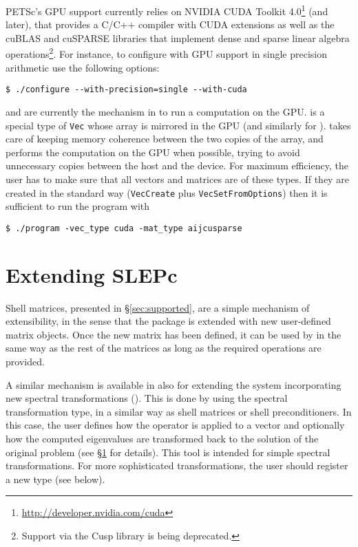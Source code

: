 PETSc's GPU support currently relies on NVIDIA CUDA Toolkit 4.0\footnote{\url{http://developer.nvidia.com/cuda}} (and later), that provides a C/C++ compiler with CUDA extensions as well as the cuBLAS and cuSPARSE libraries that implement dense and sparse linear algebra operations\footnote{Support via the Cusp library is being deprecated.}. For instance, to configure \petsc with GPU support in single precision arithmetic use the following options:
	\begin{Verbatim}[fontsize=\small]
	$ ./configure --with-precision=single --with-cuda
	\end{Verbatim}

 and  are currently the mechanism in \petsc to run a computation on the GPU.  is a special type of \texttt{Vec} whose array is mirrored in the GPU (and similarly for ). \petsc takes care of keeping memory coherence between the two copies of the array, and performs the computation on the GPU when possible, trying to avoid unnecessary copies between the host and the device. For maximum efficiency, the user has to make sure that all vectors and matrices are of these types. If they are created in the standard way (\texttt{VecCreate} plus \texttt{VecSetFromOptions}) then it is sufficient to run the \slepc program with
	\begin{Verbatim}[fontsize=\small]
	$ ./program -vec_type cuda -mat_type aijcusparse
	\end{Verbatim}

\section{Extending SLEPc}
\label{sec:shell}

	Shell matrices, presented in \S\ref{sec:supported}, are a simple mechanism of extensibility, in the sense that the package is extended with new user-defined matrix objects. Once the new matrix has been defined, it can be used by \slepc in the same way as the rest of the matrices as long as the required operations are provided.

	A similar mechanism is available in \slepc also for extending the system incorporating new spectral transformations (). This is done by using the  spectral transformation type, in a similar way as shell matrices or shell preconditioners. In this case, the user defines how the operator is applied to a vector and optionally how the computed eigenvalues are transformed back to the solution of the original problem (see \S\ref{sec:shell} for details). This tool is intended for simple spectral transformations. For more sophisticated transformations, the user should register a new  type (see below).

